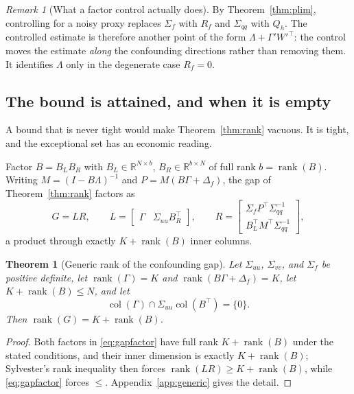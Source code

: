 \documentclass[10pt,twocolumn]{article}
\newtheorem{theorem}{Theorem}
\theoremstyle{remark}
\newtheorem{remark}{Remark}
\newcommand{\rank}{\operatorname{rank}}
\newcommand{\col}{\operatorname{col}}
\begin{document}
\begin{remark}[What a factor control actually does]
\label{rem:control}
By Theorem~\ref{thm:plim}, controlling for a noisy proxy replaces $\Sigma_f$
with $R_f$ and $\Sigma_{qq}$ with $Q_h$. The controlled estimate is therefore
another point of the form $\Lambda+\Gamma'W'^\top$: the control moves the
estimate \emph{along} the confounding directions rather than removing them. It
identifies $\Lambda$ only in the degenerate case $R_f=0$.
\end{remark}

\subsection{The bound is attained, and when it is empty}
\label{sec:sharpness}

A bound that is never tight would make Theorem~\ref{thm:rank} vacuous. It is
tight, and the exceptional set has an economic reading.

Factor $B=B_LB_R$ with $B_L\in\mathbb R^{N\times b}$, $B_R\in\mathbb
R^{b\times N}$ of full rank $b=\rank(B)$. Writing $M=(I-B\Lambda)^{-1}$ and
$P=M(B\Gamma+\Delta_f)$, the gap of Theorem~\ref{thm:rank} factors as
\begin{equation}
G=LR,\qquad
L=\begin{bmatrix}\Gamma & \Sigma_{uu}B_R^\top\end{bmatrix},\qquad
R=\begin{bmatrix}\Sigma_fP^\top\Sigma_{qq}^{-1}\\ B_L^\top
M^\top\Sigma_{qq}^{-1}\end{bmatrix},
\label{eq:gapfactor}
\end{equation}
a product through exactly $K+\rank(B)$ inner columns.

\begin{theorem}[Generic rank of the confounding gap]
\label{thm:generic}
Let $\Sigma_{uu}$, $\Sigma_{vv}$, and $\Sigma_f$ be positive definite, let
$\rank(\Gamma)=K$ and $\rank(B\Gamma+\Delta_f)=K$, let $K+\rank(B)\le N$, and
let
\begin{equation}
\col(\Gamma)\cap\Sigma_{uu}\col(B^\top)=\{0\}.
\label{eq:nooverlap}
\end{equation}
Then $\rank(G)=K+\rank(B)$.
\end{theorem}

\begin{proof}
Both factors in \eqref{eq:gapfactor} have full rank $K+\rank(B)$ under the
stated conditions, and their inner dimension is exactly $K+\rank(B)$;
Sylvester's rank inequality then forces $\rank(LR)\ge K+\rank(B)$, while
\eqref{eq:gapfactor} forces $\le$. Appendix~\ref{app:generic} gives the detail.
\end{proof}
\end{document}

